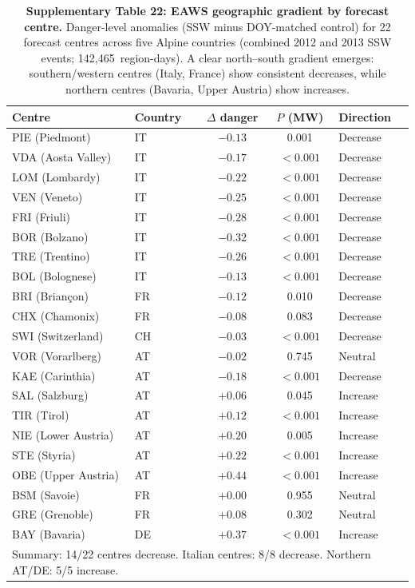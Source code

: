 \documentclass[11pt,letterpaper]{article}
\begin{document}
\begin{table}[!ht]
\centering
\caption{\textbf{Supplementary Table 22: EAWS geographic gradient by forecast centre.}
Danger-level anomalies (SSW minus DOY-matched control) for 22 forecast centres across five Alpine countries (combined 2012 and 2013 SSW events; 142,465~region-days). A clear north--south gradient emerges: southern/western centres (Italy, France) show consistent decreases, while northern centres (Bavaria, Upper Austria) show increases.}
\label{tab:eaws_gradient}
\small
\begin{tabular}{llccl}
\toprule
Centre & Country & $\Delta$ danger & $P$ (MW) & Direction \\
\midrule
PIE (Piedmont) & IT & $-0.13$ & 0.001 & Decrease \\
VDA (Aosta Valley) & IT & $-0.17$ & $< 0.001$ & Decrease \\
LOM (Lombardy) & IT & $-0.22$ & $< 0.001$ & Decrease \\
VEN (Veneto) & IT & $-0.25$ & $< 0.001$ & Decrease \\
FRI (Friuli) & IT & $-0.28$ & $< 0.001$ & Decrease \\
BOR (Bolzano) & IT & $-0.32$ & $< 0.001$ & Decrease \\
TRE (Trentino) & IT & $-0.26$ & $< 0.001$ & Decrease \\
BOL (Bolognese) & IT & $-0.13$ & $< 0.001$ & Decrease \\
BRI (Briançon) & FR & $-0.12$ & 0.010 & Decrease \\
CHX (Chamonix) & FR & $-0.08$ & 0.083 & Decrease \\
SWI (Switzerland) & CH & $-0.03$ & $< 0.001$ & Decrease \\
VOR (Vorarlberg) & AT & $-0.02$ & 0.745 & Neutral \\
KAE (Carinthia) & AT & $-0.18$ & $< 0.001$ & Decrease \\
SAL (Salzburg) & AT & $+0.06$ & 0.045 & Increase \\
TIR (Tirol) & AT & $+0.12$ & $< 0.001$ & Increase \\
NIE (Lower Austria) & AT & $+0.20$ & 0.005 & Increase \\
STE (Styria) & AT & $+0.22$ & $< 0.001$ & Increase \\
OBE (Upper Austria) & AT & $+0.44$ & $< 0.001$ & Increase \\
BSM (Savoie) & FR & $+0.00$ & 0.955 & Neutral \\
GRE (Grenoble) & FR & $+0.08$ & 0.302 & Neutral \\
BAY (Bavaria) & DE & $+0.37$ & $< 0.001$ & Increase \\
\bottomrule
\multicolumn{5}{l}{\footnotesize Summary: 14/22 centres decrease. Italian centres: 8/8 decrease. Northern AT/DE: 5/5 increase.}
\end{tabular}
\end{table}
\end{document}
